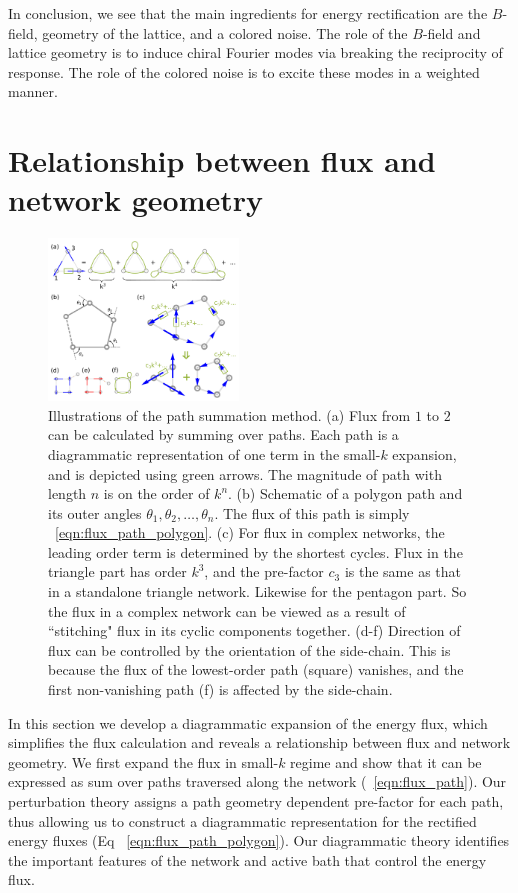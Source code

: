 \documentclass[
 preprint,
 preprintnumbers,
 amsmath,amssymb,
 aps,
 pre,
 longbibliography,
 superscriptaddress,
 10pt, twocolumn
]{revtex4-1}
\begin{document}
In conclusion, we see that the main ingredients for energy rectification are the $B$-field, geometry of the lattice, and a colored noise.
The role of the $B$-field and lattice geometry is to induce chiral Fourier modes via breaking the reciprocity of response.
The role of the colored noise is to excite these modes in a weighted manner.


\section{Relationship between flux and network geometry} \label{sec:path}
\begin{figure}[ht]
	\centering
	\includegraphics[width=0.45\textwidth]{4_path_sum.pdf}
    \caption{Illustrations of the path summation method.
    (a) Flux from $1$ to $2$ can be calculated by summing over paths. Each path is a diagrammatic representation of one term in the small-$k$ expansion, and is depicted using green arrows. The magnitude of path with length $n$ is on the order of $k^n$.
    (b) Schematic of a polygon path and its outer angles $\theta_1,\theta_2,\dots,\theta_n$. The flux of this path is simply \eqnname~\eqref{eqn:flux_path_polygon}.
    (c) For flux in complex networks, the leading order term is determined by the shortest cycles. Flux in the triangle part has order $k^3$, and the pre-factor $c_3$ is the same as that in a standalone triangle network. Likewise for the pentagon part. So the flux in a complex network can be viewed as a result of ``stitching" flux in its cyclic components together.
    (d-f) Direction of flux can be controlled by the orientation of the side-chain. This is because the flux of the lowest-order path (square) vanishes, and the first non-vanishing path (f) is affected by the side-chain.
    }
    \label{fig:path_sum}
\end{figure}

In this section we develop a diagrammatic expansion of the energy flux, which simplifies the flux calculation and reveals a relationship between flux and network geometry.
We first expand the flux in small-$k$ regime and show that it can be expressed as sum over paths traversed along the network (\eqnname~\eqref{eqn:flux_path}). Our perturbation theory assigns a path geometry dependent pre-factor for each path, thus allowing us to construct a diagrammatic representation for the rectified energy fluxes (Eq \eqnname~\eqref{eqn:flux_path_polygon}). Our diagrammatic theory identifies the important features of the network and active bath that control the energy flux. 
\end{document}

